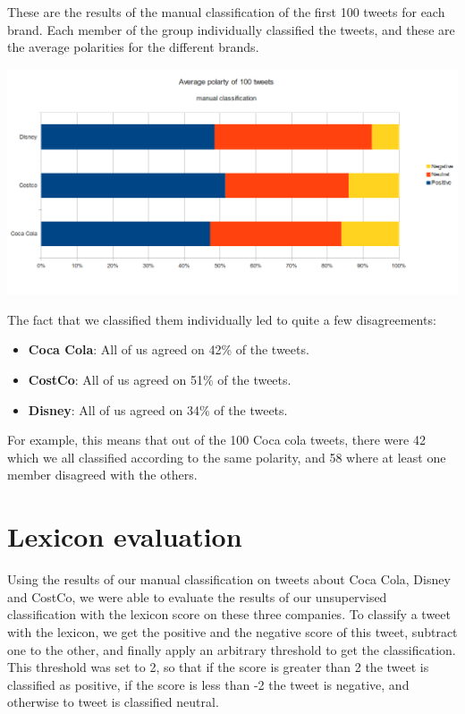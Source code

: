 \documentclass[a4paper,12pt]{report}
\begin{document}
These are the results of the manual classification of the first 100 tweets for each brand. Each member of the group individually classified the tweets, and these are the average polarities for the different brands.

\centerline{\includegraphics[scale=0.6]{../img/man1.png}}

The fact that we classified them individually led to quite a few disagreements:

\begin{itemize}
        \item \textbf{Coca Cola}: All of us agreed on 42\% of the tweets.
        \item \textbf{CostCo}: All of us agreed on 51\% of the tweets.
        \item \textbf{Disney}: All of us agreed on 34\% of the tweets.
\end{itemize}

For example, this means that out of the 100 Coca cola tweets, there were 42 which we all classified according to the same polarity, and 58 where at least one member disagreed with the others.

\section{Lexicon evaluation}

Using the results of our manual classification on tweets about Coca Cola, Disney and CostCo, we were able to evaluate the results of our unsupervised classification with the lexicon score on these three companies.
To classify a tweet with the lexicon, we get the positive and the negative score of this tweet, subtract one to the other, and finally apply an arbitrary threshold to get the classification.
This threshold was set to 2, so that if the score is greater than 2 the tweet is classified as positive, if the score is less than -2 the tweet is negative, and otherwise to tweet is classified neutral.
\end{document}
